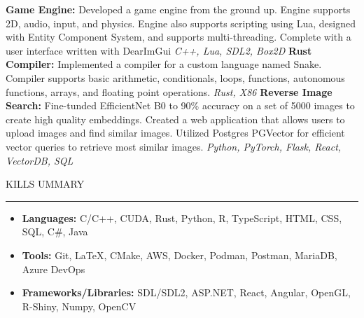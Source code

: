 \documentclass[11pt]{article}
\begin{document}
\textbf{Game Engine:} Developed a game engine from the ground up. Engine supports 2D, audio, input, and physics. Engine also supports scripting using Lua, designed with Entity Component System, and supports multi-threading. Complete with a user interface written with DearImGui   \hfill 
\textit{C++, Lua, SDL2, Box2D}
\newline
\textbf{Rust Compiler:} Implemented a compiler for a custom language named Snake. Compiler supports basic arithmetic, conditionals, loops, functions, autonomous functions, arrays, and floating point operations. \hfill \textit{Rust, X86}
\newline
\textbf{Reverse Image Search:} Fine-tunded EfficientNet B0 to 90\% accuracy on a set of 5000 images to create high quality embeddings. Created a web application that allows users to upload images and find similar images. Utilized Postgres PGVector for efficient vector queries to retrieve most similar images. \hfill \textit{Python, PyTorch, Flask, React, VectorDB, SQL}
\newline

\par \scalebox{1.3}{S}KILLS \scalebox{1.3}{S}UMMARY                  
\par \vspace{-0.1in} \noindent\rule{7.8in}{0.5pt} 

\begin{itemize}
    \item \textbf{Languages:} \hspace*{3cm} C/C++, CUDA, Rust, Python, R, TypeScript, HTML, CSS, SQL, C\#, Java
    \item \textbf{Tools:} \hspace*{4cm} Git, \LaTeX, CMake, AWS, Docker, Podman, Postman, MariaDB, Azure DevOps
    \item \textbf{Frameworks/Libraries:} \hspace*{0.9cm}SDL/SDL2, ASP.NET, React, Angular, OpenGL, R-Shiny, Numpy, OpenCV
\end{itemize}
\end{document}
